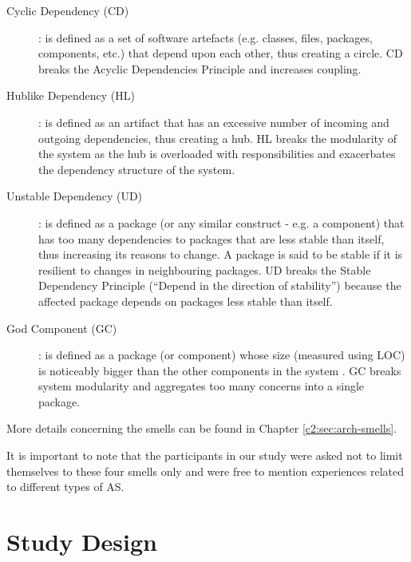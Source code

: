 \begin{description}
	\item[Cyclic Dependency (CD)]: is defined as a set of software artefacts (e.g. classes, files, packages, components, etc.) that depend upon each other, thus creating a circle. CD breaks the Acyclic Dependencies Principle \cite{Martin2018} and increases coupling.
	
	\item[Hublike Dependency (HL)]: is defined as an artifact that has an excessive number of incoming and outgoing dependencies, thus creating a hub. HL breaks the modularity of the system as the hub is overloaded with responsibilities and exacerbates the dependency structure of the system.

	\item[Unstable Dependency (UD)]: is defined as a package (or any similar construct - e.g. a component) that has too many dependencies to packages that are less stable than itself, thus increasing its reasons to change. A package is said to be stable if it is resilient to changes in neighbouring packages. UD breaks the Stable Dependency Principle (“Depend in the direction of stability”) \cite{Martin2018} because the affected package depends on packages less stable than itself.
	
	\item[God Component (GC)]: is defined as a package (or component) whose size (measured using LOC) is noticeably bigger than the other components in the system  \cite{Lippert2006}. GC breaks system modularity and aggregates too many concerns into a single package.
\end{description}
More details concerning the smells can be found in Chapter \ref{c2:sec:arch-smells}.

It is important to note that the participants in our study were asked not to limit themselves to these four smells only and were free to mention experiences related to different types of AS.

\section{Study Design}\label{c3:sec:case-study}
